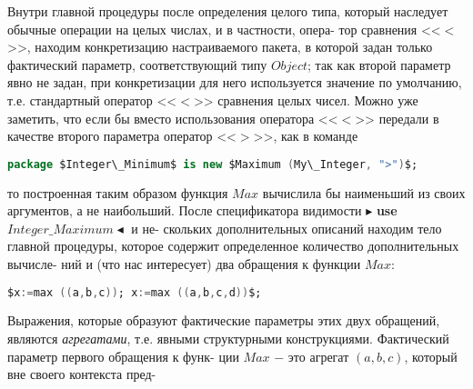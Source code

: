 \documentclass{./git_rep/mai_prac_2017/template/mai_book}
\begin{document}
Внутри главной процедуры после определения  целого типа, который\linebreak
наследует обычные операции на целых числах, и в частности, опера-\linebreak
тор сравнения <<$<$>>, находим конкретизацию настраиваемого пакета, в\linebreak
которой задан только фактический параметр, соответствующий типу\linebreak
$Object$; так как второй параметр явно не задан, при конкретизации для\linebreak
него используется значение по умолчанию, т.е. стандартный оператор\linebreak
<<$<$>> сравнения целых чисел. Можно уже заметить, что если бы вместо\linebreak
использования оператора <<$<$>> передали  в качестве второго параметра\linebreak
оператор <<$>$>>, как в команде
\begin{lstlisting}[mathescape=true, frame=none, language=Ada, xleftmargin=15pt]
package $Integer\_Minimum$ is new $Maximum (My\_Integer, ">")$;
\end{lstlisting}
то построенная таким образом функция $Max$ вычислила бы наименьший\linebreak
из своих аргументов, а не наибольший.\newline
\hspace*{15pt}После спецификатора видимости $\blacktriangleright$ \textbf{use} $Integer\_Maximum \blacktriangleleft$ и не-\linebreak
скольких дополнительных описаний находим тело главной процедуры,\linebreak
которое содержит определенное количество дополнительных вычисле-\linebreak
ний и (что нас интересует) два обращения к функции $Max$:
\begin{lstlisting}[mathescape=true, language=Ada, frame=none, xleftmargin=15pt]
$x:=max ((a,b,c)); x:=max ((a,b,c,d))$;
\end{lstlisting}
Выражения,  которые  образуют  фактические  параметры  этих  двух\linebreak
обращений,  являются \textit{агрегатами}, т.е.  явными  структурными\linebreak
конструкциями.  Фактический  параметр первого обращения  к функ-\linebreak
ции $Max$ $-$ это агрегат $(a,b,c)$, который вне своего контекста пред­-\linebreak
\end{document}
